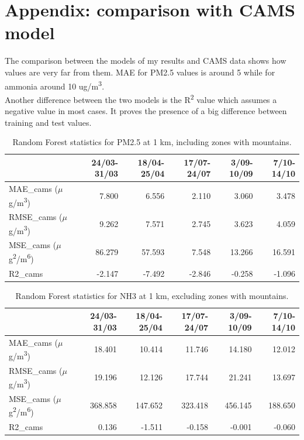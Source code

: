 \chapter{Appendix: comparison with CAMS model  }
\label{chap:appendixCAMS}
The comparison between the models of my results and CAMS data shows how values are very far from them. MAE for PM2.5 values is around 5 while for ammonia around 10 ug/m\textsuperscript{3}. \\
Another difference between the two models is the R\textsuperscript{2} value which assumes a negative value in most cases. It proves the presence of a big difference between training and test values. 
\begin{table}[H]
\begin{tabular}{lrrrrr}
\toprule
  &  24/03-31/03 &  18/04-25/04 &  17/07-24/07 &  3/09-10/09 &  7/10-14/10 \\
\midrule
  MAE\_cams ($\mu$g/m\textsuperscript{3})&        7.800 &        6.556 &        2.110 &       3.060 &       3.478 \\
  RMSE\_cams ($\mu$g/m\textsuperscript{3})&        9.262 &        7.571 &        2.745 &       3.623 &       4.059 \\
   MSE\_cams ($\mu$g\textsuperscript{2}/m\textsuperscript{6})&       86.279 &       57.593 &        7.548 &      13.266 &      16.591 \\
    R2\_cams &       -2.147 &       -7.492 &       -2.846 &      -0.258 &      -1.096 \\
\bottomrule
\end{tabular}
\caption{Random Forest statistics for PM2.5 at 1 km, including zones with mountains.}
\label{tab:cams1}
\end{table}
\begin{table}[H]
\begin{tabular}{lrrrrr}
\toprule
  &  24/03-31/03 &  18/04-25/04 &  17/07-24/07 &  3/09-10/09 &  7/10-14/10 \\
\midrule
   MAE\_cams ($\mu$g/m\textsuperscript{3})&       18.401 &       10.414 &       11.746 &      14.180 &      12.012 \\
  RMSE\_cams ($\mu$g/m\textsuperscript{3})&       19.196 &       12.126 &       17.744 &      21.241 &      13.697 \\
   MSE\_cams ($\mu$g\textsuperscript{2}/m\textsuperscript{6})&      368.858 &      147.652 &      323.418 &     456.145 &     188.650 \\
    R2\_cams &        0.136 &       -1.511 &       -0.158 &      -0.001 &      -0.060 \\
\bottomrule
\end{tabular}
\caption{Random Forest statistics for NH3 at 1 km, excluding zones with mountains.}
\label{tab:cams2}
\end{table}
